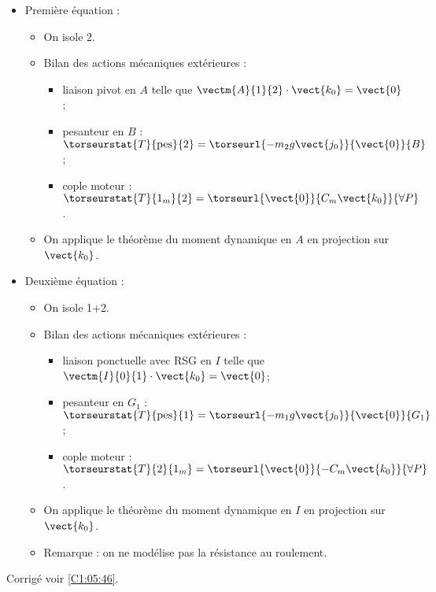 \begin{itemize}
\item Première équation : 
\begin{itemize}
\item On isole 2.
\item Bilan des actions mécaniques extérieures :
\begin{itemize}
\item liaison pivot en $A$ telle que $\vectm{A}{1}{2}\cdot \vect{k_0} = \vect{0}$;
\item pesanteur en $B$ : $\torseurstat{T}{\text{pes}}{2} = \torseurl{-m_2 g \vect{j_0}}{\vect{0}}{B}$;
\item cople moteur : $\torseurstat{T}{1_m}{2} = \torseurl{\vect{0}}{C_m\vect{k_0}}{\forall P}$.
\end{itemize}
\item On applique le théorème du moment dynamique en $A$ en projection sur $\vect{k_0}$.
\end{itemize}
\item Deuxième équation : 
\begin{itemize}
\item On isole 1+2.
\item Bilan des actions mécaniques extérieures :
\begin{itemize}
\item liaison ponctuelle avec RSG en $I$ telle que $\vectm{I}{0}{1}\cdot \vect{k_0} = \vect{0}$; 
\item pesanteur en $G_1$  : $\torseurstat{T}{\text{pes}}{1} = \torseurl{-m_1 g \vect{j_0}}{\vect{0}}{G_1}$;
\item cople moteur : $\torseurstat{T}{2}{1_m} = \torseurl{\vect{0}}{-C_m\vect{k_0}}{\forall P}$.
\end{itemize}
\item On applique le théorème du moment dynamique en $I$ en projection sur $\vect{k_0}$.
\item Remarque : on ne modélise pas la résistance au roulement. 
\end{itemize}

\end{itemize}
\else
\fi



\ifcolle
{}
\else
\fi

\ifprof
\else
\begin{flushright}
\footnotesize{Corrigé  voir \ref{C1:05:46}.}
\end{flushright}%
\fi
